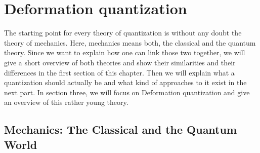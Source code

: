 
%
%

\chapter{Deformation quantization}

The starting point for every theory of quantization is without any doubt the 
theory of mechanics. Here, 
mechanics means both, the classical and the quantum theory. Since we want to 
explain how one can link those two together, we will give a short overview of both 
theories and show their similarities and their differences in the first section 
of this chapter. Then we will explain what a quantization should actually be and 
what kind of approaches to it exist in the next part. In section three, we will 
focus on Deformation quantization and give an overview of this rather young 
theory.



\section{Mechanics: The Classical and the Quantum World}
\label{sec:chap2_Mechanics}


